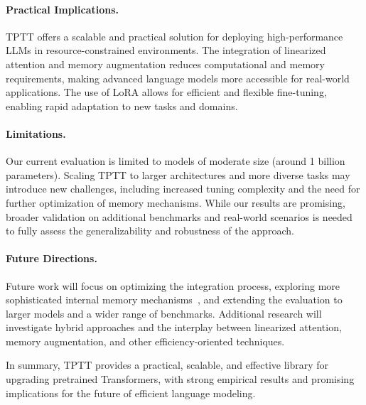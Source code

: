 \documentclass[10pt,a4paper]{article}
\begin{document}
\paragraph{Practical Implications.}
TPTT offers a scalable and practical solution for deploying high-performance LLMs in resource-constrained environments. The integration of linearized attention and memory augmentation reduces computational and memory requirements, making advanced language models more accessible for real-world applications. The use of LoRA allows for efficient and flexible fine-tuning, enabling rapid adaptation to new tasks and domains.

\paragraph{Limitations.}
Our current evaluation is limited to models of moderate size (around 1 billion parameters). Scaling TPTT to larger architectures and more diverse tasks may introduce new challenges, including increased tuning complexity and the need for further optimization of memory mechanisms. While our results are promising, broader validation on additional benchmarks and real-world scenarios is needed to fully assess the generalizability and robustness of the approach.

\paragraph{Future Directions.}
Future work will focus on optimizing the integration process, exploring more sophisticated internal memory mechanisms~\cite{behrouz2024titans}, and extending the evaluation to larger models and a wider range of benchmarks. Additional research will investigate hybrid approaches and the interplay between linearized attention, memory augmentation, and other efficiency-oriented techniques.

In summary, TPTT provides a practical, scalable, and effective library for upgrading pretrained Transformers, with strong empirical results and promising implications for the future of efficient language modeling.




\end{document}
